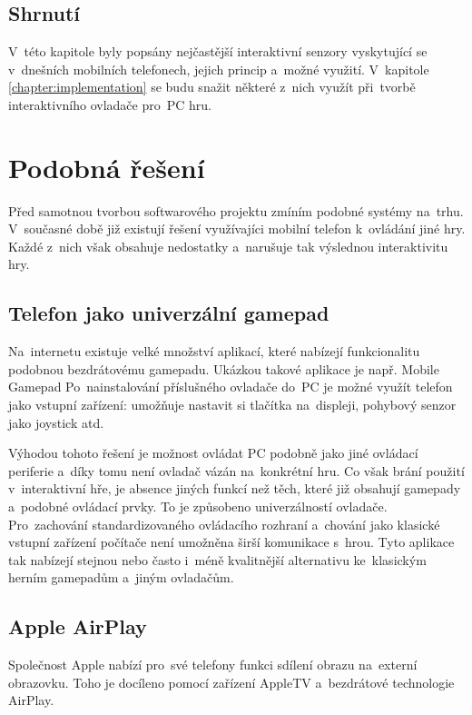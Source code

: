 \documentclass[thesis=B,czech,hidelinks]{FITthesis}[2012/06/26] %
\begin{document}
\section{Shrnutí}

V~této kapitole byly popsány nejčastější interaktivní senzory vyskytující se v~dnešních mobilních telefonech, jejich princip a~možné využití. V~kapitole \ref{chapter:implementation} se budu snažit některé z~nich využít při~tvorbě interaktivního ovladače pro~PC hru. 

\chapter{Podobná řešení}

Před samotnou tvorbou softwarového projektu zmíním podobné systémy na~trhu. V~současné době již existují řešení využívajíci mobilní telefon k~ovládání jiné hry. Každé z~nich však obsahuje nedostatky a~narušuje tak výslednou interaktivitu hry.

\section{Telefon jako univerzální gamepad}

Na~internetu existuje velké množství aplikací, které nabízejí funkcionalitu podobnou bezdrátovému gamepadu. Ukázkou takové aplikace je např. Mobile Gamepad \cite{mobilegamepad} Po~nainstalování příslušného ovladače do~PC je možné využít telefon jako vstupní zařízení: umožňuje nastavit si tlačítka na~displeji, pohybový senzor jako joystick atd.

Výhodou tohoto řešení je možnost ovládat PC podobně jako jiné ovládací periferie a~díky tomu není ovladač vázán na~konkrétní hru. Co však brání použití v~interaktivní hře, je absence jiných funkcí než těch, které již obsahují gamepady a~podobné ovládací prvky. To je způsobeno univerzálností ovladače. Pro~zachování standardizovaného ovládacího rozhraní a~chování jako klasické vstupní zařízení počítače není umožněna širší komunikace s~hrou. Tyto aplikace tak nabízejí stejnou nebo často i~méně kvalitnější alternativu ke~klasickým herním gamepadům a~jiným ovladačům. 

\section{Apple AirPlay}

Společnost Apple nabízí pro~své telefony funkci sdílení obrazu na~externí obrazovku. Toho je docíleno pomocí zařízení AppleTV a~bezdrátové technologie AirPlay\cite{airplay}.
\end{document}

